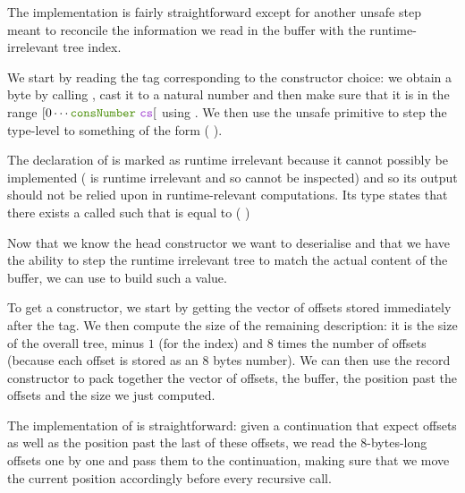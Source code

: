 
The implementation is fairly straightforward except for another
unsafe step meant to reconcile the information we read in the buffer
with the runtime-irrelevant tree index.


We start by reading the tag 
corresponding to the constructor choice:
we obtain a byte by calling , cast it to a
natural number and then make sure that it is in the range
$[0 \cdots \text{\IdrisFunction{consNumber} \IdrisBound{cs}}[$ using
.
%
We then use the unsafe  primitive to step the
type-level  to something of the form
( \IdrisData{\#} ).


The declaration of  is marked as runtime
irrelevant because it cannot possibly be implemented
( is runtime irrelevant and so cannot be inspected)
and so its output should not be relied upon in runtime-relevant
computations.
%
Its type states that there exists a  called
 such that  is equal to
( \IdrisData{\#} )

Now that we know the head constructor we want to deserialise and that
we have the ability to step the runtime irrelevant tree to match the
actual content of the buffer, we can use 
to build such a value.


To get a constructor, we start by getting the vector of offsets stored
immediately after the tag. We then compute the size of the remaining
 description: it is the size of the overall tree,
minus $1$ (for the index) and $8$ times the number of offsets (because
each offset is stored as an 8 bytes number).
%
We can then use the record constructor  to pack
together the vector of offsets, the buffer, the position past the offsets
and the size we just computed.


The implementation of  is straightforward: given
a continuation that expect  offsets as well as the
position past the last of these offsets, we read the 8-bytes-long
offsets one by one and pass them to the continuation, making sure
that we move the current position accordingly before every recursive call.

